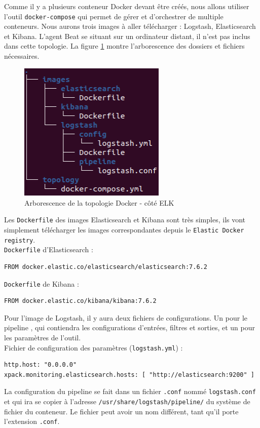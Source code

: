 \documentclass[paper=a4, fontsize=11pt]{scrartcl}
\begin{document}
Comme il y a plusieurs conteneur Docker devant être créés, nous allons utiliser l'outil \verb,docker-compose, qui permet de gérer et d'orchestrer de multiple conteneurs. Nous aurons trois images à aller télécharger : Logstash, Elasticsearch et Kibana. L'agent Beat se situant sur un ordinateur distant, il n'est pas inclus dans cette topologie. La figure \ref{f-treeDocker} montre l'arborescence des dossiers et fichiers nécessaires.
\begin{figure}[H]
    \centering
    \includegraphics[width=7cm]{img/screenshots/tree_docker.png}
    \caption{Arborescence de la topologie Docker - côté ELK}
    \label{f-treeDocker}
\end{figure}
Les \verb,Dockerfile, des images Elasticsearch et Kibana sont très simples, ils vont simplement télécharger les images correspondantes depuis le \verb,Elastic Docker registry,.\\
\verb,Dockerfile, d'Elasticsearch :
\begin{lstlisting}
FROM docker.elastic.co/elasticsearch/elasticsearch:7.6.2
\end{lstlisting}
\verb,Dockerfile, de Kibana :
\begin{lstlisting}
FROM docker.elastic.co/kibana/kibana:7.6.2
\end{lstlisting}

Pour l'image de Logstash, il y aura deux fichiers de configurations. Un pour le \og pipeline \fg, qui contiendra les configurations d'entrées, filtres et sorties, et un pour les paramètres de l'outil. \\
Fichier de configuration des paramètres (\verb,logstash.yml,) :
\begin{lstlisting}
http.host: "0.0.0.0"
xpack.monitoring.elasticsearch.hosts: [ "http://elasticsearch:9200" ]
\end{lstlisting}
La configuration du pipeline se fait dans un fichier \verb,.conf, nommé \verb,logstash.conf, et qui ira se copier à l'adresse \verb,/usr/share/logstash/pipeline/, du système de fichier du conteneur. Le fichier peut avoir un nom différent, tant qu'il porte l'extension \verb,.conf,.
\end{document}
